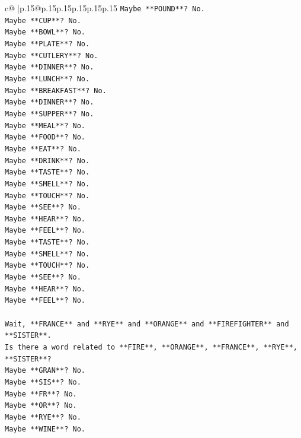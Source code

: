 \documentclass{article}
\begin{document}
{\begin{supertabular}{c@{$\;$}|p{.15\linewidth}@{}p{.15\linewidth}p{.15\linewidth}p{.15\linewidth}p{.15\linewidth}p{.15\linewidth}}
{{{\texttt{Maybe **POUND**? No.} \\
\texttt{Maybe **CUP**? No.} \\
\texttt{Maybe **BOWL**? No.} \\
\texttt{Maybe **PLATE**? No.} \\
\texttt{Maybe **CUTLERY**? No.} \\
\texttt{Maybe **DINNER**? No.} \\
\texttt{Maybe **LUNCH**? No.} \\
\texttt{Maybe **BREAKFAST**? No.} \\
\texttt{Maybe **DINNER**? No.} \\
\texttt{Maybe **SUPPER**? No.} \\
\texttt{Maybe **MEAL**? No.} \\
\texttt{Maybe **FOOD**? No.} \\
\texttt{Maybe **EAT**? No.} \\
\texttt{Maybe **DRINK**? No.} \\
\texttt{Maybe **TASTE**? No.} \\
\texttt{Maybe **SMELL**? No.} \\
\texttt{Maybe **TOUCH**? No.} \\
\texttt{Maybe **SEE**? No.} \\
\texttt{Maybe **HEAR**? No.} \\
\texttt{Maybe **FEEL**? No.} \\
\texttt{Maybe **TASTE**? No.} \\
\texttt{Maybe **SMELL**? No.} \\
\texttt{Maybe **TOUCH**? No.} \\
\texttt{Maybe **SEE**? No.} \\
\texttt{Maybe **HEAR**? No.} \\
\texttt{Maybe **FEEL**? No.} \\
\\ 
\texttt{Wait, **FRANCE** and **RYE** and **ORANGE** and **FIREFIGHTER** and **SISTER**.} \\
\texttt{Is there a word related to **FIRE**, **ORANGE**, **FRANCE**, **RYE**, **SISTER**?} \\
\texttt{Maybe **GRAN**? No.} \\
\texttt{Maybe **SIS**? No.} \\
\texttt{Maybe **FR**? No.} \\
\texttt{Maybe **OR**? No.} \\
\texttt{Maybe **RYE**? No.} \\
\texttt{Maybe **WINE**? No.} \\
}}}
\end{supertabular}}
\end{document}
